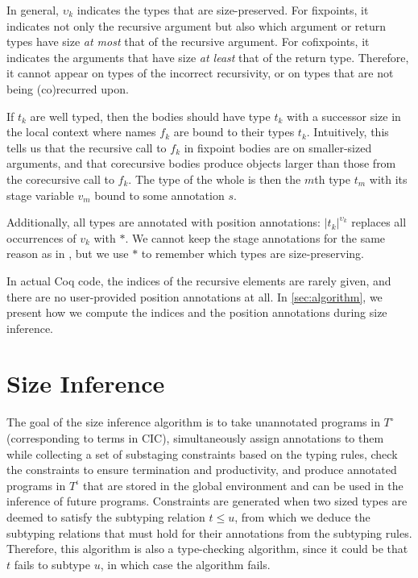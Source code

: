 \documentclass[nonacm,screen,10pt]{acmart}
\begin{document}
In general, $\upsilon_k$ indicates the types that are size-preserved. For fixpoints, it indicates not only the recursive argument but also which argument or return types have size \textit{at most} that of the recursive argument. For cofixpoints, it indicates the arguments that have size \textit{at least} that of the return type. Therefore, it cannot appear on types of the incorrect recursivity, or on types that are not being (co)\-recurred upon. 

If $t_k$ are well typed, then the \cofixpoint bodies should have type $t_k$ with a successor size in the local context where \cofixpoint names $f_k$ are bound to their types $t_k$. Intuitively, this tells us that the recursive call to $f_k$ in fixpoint bodies are on smaller-sized arguments, and that corecursive bodies produce objects larger than those from the corecursive call to $f_k$. The type of the whole \cofixpoint is then the $m$th type $t_m$ with its stage variable $v_m$ bound to some annotation $s$.

Additionally, all \cofixpoint types are annotated with position annotations: $|t_k|^{\upsilon_k}$ replaces all occurrences of $v_k$ with $*$. We cannot keep the stage annotations for the same reason as in , but we use $*$ to remember which types are size-preserving.

In actual Coq code, the indices of the recursive elements are rarely given, and there are no user-provided position annotations at all. In \autoref{sec:algorithm}, we present how we compute the indices and the position annotations during size inference.

\section{Size Inference}\label{sec:algorithm}

The goal of the size inference algorithm is to take unannotated programs in $T^\circ$ (corresponding to terms in CIC), simultaneously assign annotations to them while collecting a set of substaging constraints based on the typing rules, check the constraints to ensure termination and productivity, and produce annotated programs in $T^\iota$ that are stored in the global environment and can be used in the inference of future programs. Constraints are generated when two sized types are deemed to satisfy the subtyping relation $t \leq u$, from which we deduce the subtyping relations that must hold for their annotations from the subtyping rules. Therefore, this algorithm is also a type-checking algorithm, since it could be that $t$ fails to subtype $u$, in which case the algorithm fails.
\end{document}
